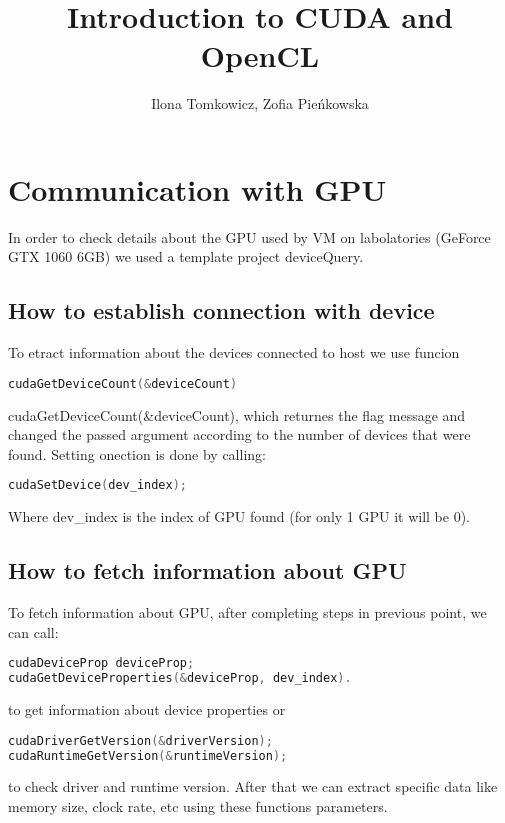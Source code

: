 \documentclass[12pt]{article}
\begin{document}
\title{Introduction to CUDA and OpenCL}
\author{Ilona Tomkowicz, Zofia Pieńkowska}

\maketitle
\tableofcontents
\newpage

\section{Communication with GPU} \label{gpu_communication}

In order to check details about the GPU used by VM on labolatories (GeForce GTX 1060 6GB) we used a template project deviceQuery.

\subsection{How to establish connection with device} \label{ht_open_connection}
To etract information about the devices connected to host we use funcion
\begin{lstlisting}[language=C]
cudaGetDeviceCount(&deviceCount)
\end{lstlisting} cudaGetDeviceCount(\&deviceCount), which returnes the flag message and changed the passed argument according to the number of devices that were found. Setting onection is done by calling:
\begin{lstlisting}[language=C]
cudaSetDevice(dev_index);
\end{lstlisting}
Where dev\_index is the index of GPU found (for only 1 GPU it will be 0).

\subsection{How to fetch information about GPU} \label{fetch_info}
To fetch information about GPU, after completing steps in previous point, we can call:
\begin{lstlisting}[language=C]
cudaDeviceProp deviceProp;
cudaGetDeviceProperties(&deviceProp, dev_index).
\end{lstlisting}
to get information about device properties or 
\begin{lstlisting}[language=C]
cudaDriverGetVersion(&driverVersion);
cudaRuntimeGetVersion(&runtimeVersion);
\end{lstlisting}
to check driver and runtime version.
After that we can extract specific data like memory size, clock rate, etc using these functions parameters.
\end{document}
